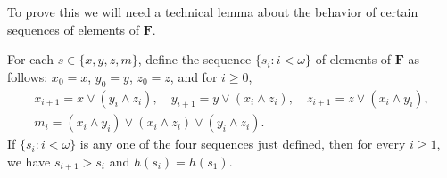 To prove this we will need a technical lemma about the behavior of 
certain sequences of elements of $\mathbf F$.

\begin{lemma}\label{claim:2.3}
For each $s \in \{x, y, z, m\}$, define the sequence $\{s_i : i < \omega\}$
of elements of $\mathbf F$ as follows: 
$x_0 = x$, $y_0 = y$, $z_0 = z$, and for $i\geqslant 0$, 
\begin{gather*}
  x_{i+1} = x\vee (y_i \wedge z_i), \quad  y_{i+1} = y\vee (x_i \wedge z_i), \quad  z_{i+1} = z\vee (x_i \wedge y_i),\\
  m_i = (x_i \wedge y_i) \vee (x_i \wedge z_i) \vee (y_i \wedge z_i).
\end{gather*}
  If $\{s_i : i< \omega\}$ is any one of the four sequences just defined, then for every $i\geq 1$, 
  we have $s_{i+1} > s_i$ and $h(s_{i}) = h(s_1)$.
\end{lemma}
